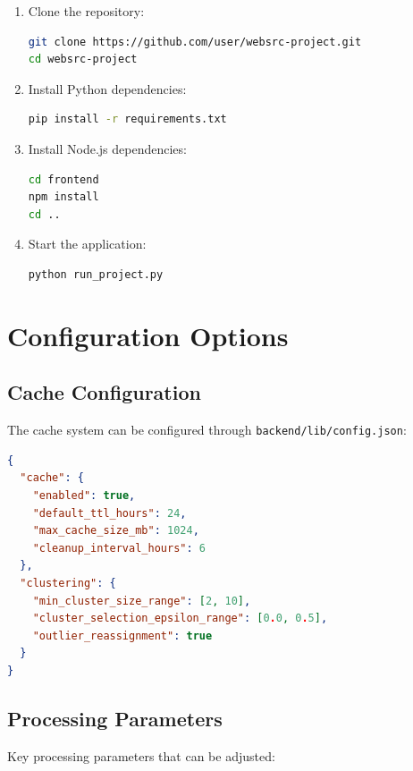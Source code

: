 \begin{enumerate}
\item Clone the repository:
\begin{lstlisting}[language=bash]
git clone https://github.com/user/websrc-project.git
cd websrc-project
\end{lstlisting}

\item Install Python dependencies:
\begin{lstlisting}[language=bash]
pip install -r requirements.txt
\end{lstlisting}

\item Install Node.js dependencies:
\begin{lstlisting}[language=bash]
cd frontend
npm install
cd ..
\end{lstlisting}

\item Start the application:
\begin{lstlisting}[language=bash]
python run_project.py
\end{lstlisting}
\end{enumerate}

\section{Configuration Options}
\label{app:configuration}

\subsection{Cache Configuration}

The cache system can be configured through \texttt{backend/lib/config.json}:

\begin{lstlisting}[language=json]
{
  "cache": {
    "enabled": true,
    "default_ttl_hours": 24,
    "max_cache_size_mb": 1024,
    "cleanup_interval_hours": 6
  },
  "clustering": {
    "min_cluster_size_range": [2, 10],
    "cluster_selection_epsilon_range": [0.0, 0.5],
    "outlier_reassignment": true
  }
}
\end{lstlisting}

\subsection{Processing Parameters}

Key processing parameters that can be adjusted:

